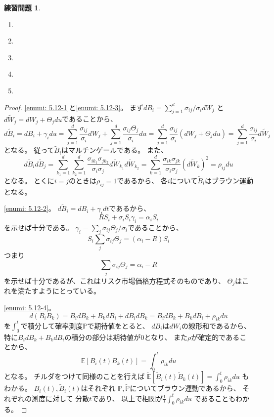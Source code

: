 \documentclass[uplatex]{jsarticle}
\theoremstyle{definition}
\newtheorem{prob}[prob]{練習問題}
\def\P{\mathbb{P}}
\def\E{\mathbb{E}}
\begin{document}
\begin{prob}\label{prob: 5.12}
  \begin{enumerate}
    \item \label{enumi: 5.12-1}
    \item \label{enumi: 5.12-2}
    \item \label{enumi: 5.12-3}
    \item \label{enumi: 5.12-4}
    \item \label{enumi: 5.12-5}
  \end{enumerate}
\end{prob}

\begin{proof}
  \ref{enumi: 5.12-1}と\ref{enumi: 5.12-3}。
  まず\(dB_i = \sum_{j=1}^d \sigma_{ij}/\sigma_i dW_j\)
  と\(d\tilde{W}_j = dW_j + \Theta_j du\)であることから、
  \[
  d\tilde{B}_i = dB_i + \gamma_i du
  = \sum_{j=1}^d \frac{\sigma_{ij}}{\sigma_i} dW_j
  + \sum_{j=1}^d \frac{\sigma_{ij}\Theta_j}{\sigma_i} du
  = \sum_{j=1}^d \frac{\sigma_{ij}}{\sigma_i} (dW_j + \Theta_j du)
  = \sum_{j=1}^d \frac{\sigma_{ij}}{\sigma_i} d\tilde{W}_j
  \]
  となる。
  従って\(\tilde{B}_i\)はマルチンゲールである。
  また、
  \[
  d\tilde{B}_id\tilde{B}_j
  = \sum_{k_1=1}^d\sum_{k_2=1}^d
  \frac{\sigma_{ik_1}\sigma_{jk_2}}{\sigma_i\sigma_j}
  d\tilde{W}_{k_1}d\tilde{W}_{k_2}
  = \sum_{k=1}^d
  \frac{\sigma_{ik}\sigma_{jk}}{\sigma_i\sigma_j} (d\tilde{W}_k)^2
  = \rho_{ij} du
  \]
  となる。
  とくに\(i=j\)のときは\(\rho_{ij}=1\)であるから、
  各\(i\)について\(\tilde{B}_i\)はブラウン運動となる。

  \ref{enumi: 5.12-2}。
  \(d\tilde{B}_i = dB_i + \gamma_i dt\)であるから、
  \[
  RS_i + \sigma_iS_i\gamma_i = \alpha_iS_i
  \]
  を示せば十分である。
  \(\gamma_i = \sum_j\sigma_{ij}\Theta_j/\sigma_i\)であることから、
  \[
  S_i\sum_j\sigma_{ij}\Theta_j = (\alpha_i - R)S_i
  \]
  つまり
  \[\sum_j\sigma_{ij}\Theta_j = \alpha_i - R\]
  を示せば十分であるが、これはリスク市場価格方程式そのものであり、
  \(\Theta_j\)はこれを満たすようにとっている。

  \ref{enumi: 5.12-4}。
  \[
  d(B_iB_k) = B_idB_k + B_kdB_i + dB_idB_k
  = B_idB_k + B_kdB_i + \rho_{ik}du
  \]
  を\(\int_0^t\)で積分して確率測度\(\P\)で期待値をとると、
  \(dB_i\)は\(dW_i\)の線形和であるから、
  特に\(B_idB_k + B_kdB_i\)の積分の部分は期待値が\(0\)となり、
  また\(\rho\)が確定的であることから、
  \[
  \E[B_i(t)B_k(t)] = \int_0^t\rho_{ik}du
  \]
  となる。
  チルダをつけて同様のことを行えば
  \(\tilde{\E}[\tilde{B}_i(t)\tilde{B}_k(t)]
  = \int_0^t\rho_{ik}du\)
  もわかる。
  \(B_i(t),\tilde{B}_i(t)\)はそれぞれ
  \(\P, \tilde{\P}\)についてブラウン運動であるから、
  それぞれの測度に対して
  分散\(t\)であり、
  以上で相関が\(\frac{1}{t}\int_0^t\rho_{ik}du\)
  であることもわかる。


\end{proof}
\end{document}
